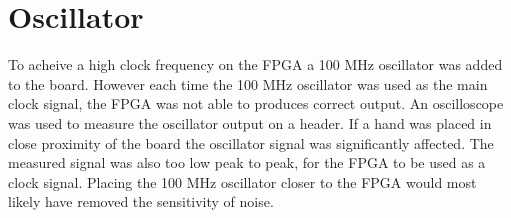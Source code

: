 \section{Oscillator}
To acheive a high clock frequency on the FPGA a 100 MHz oscillator was added to the board.
However each time the 100 MHz oscillator was used as the main clock signal,
the FPGA was not able to produces correct output.
An oscilloscope was used to measure the oscillator output on a header.
If a hand was placed in close proximity of the board the oscillator signal was significantly affected.
The measured signal was also too low peak to peak, for the FPGA to be used as a clock signal.
Placing the 100 MHz oscillator closer to the FPGA would most likely have removed the sensitivity of noise.
